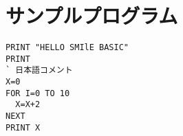 \documentclass[slide,papersize,landscape,10pt]{jsarticle}
\begin{document}
\section{サンプルプログラム}

\begin{lstlisting}[language=smilebasic]
PRINT "HELLO SMIlE BASIC"
PRINT 
` 日本語コメント
X=0
FOR I=0 TO 10
  X=X+2
NEXT
PRINT X
\end{lstlisting}
\end{document}
